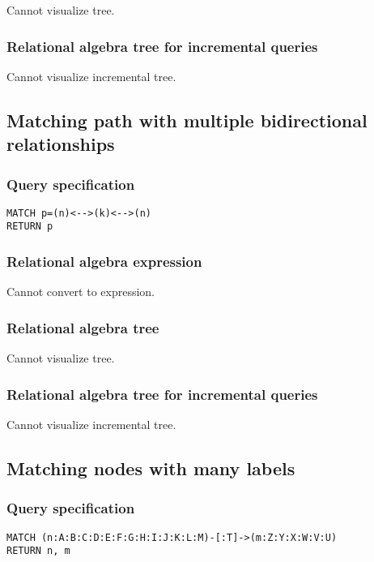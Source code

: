 Cannot visualize tree.

\subsubsection*{Relational algebra tree for incremental queries}

Cannot visualize incremental tree.

\subsection{Matching path with multiple bidirectional relationships}

\subsubsection*{Query specification}

\begin{lstlisting}
MATCH p=(n)<-->(k)<-->(n)
RETURN p
\end{lstlisting}

\subsubsection*{Relational algebra expression}

Cannot convert to expression.

\subsubsection*{Relational algebra tree}

Cannot visualize tree.

\subsubsection*{Relational algebra tree for incremental queries}

Cannot visualize incremental tree.

\subsection{Matching nodes with many labels}

\subsubsection*{Query specification}

\begin{lstlisting}
MATCH (n:A:B:C:D:E:F:G:H:I:J:K:L:M)-[:T]->(m:Z:Y:X:W:V:U)
RETURN n, m
\end{lstlisting}

